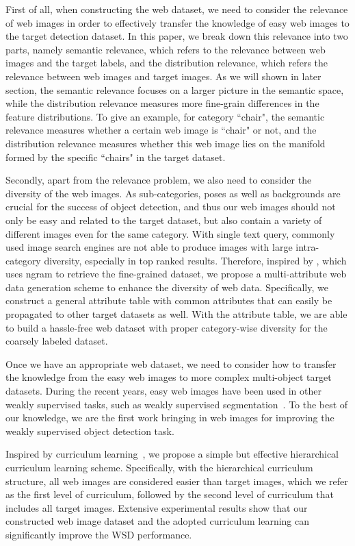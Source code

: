 \documentclass[10pt,twocolumn,letterpaper]{article}
\begin{document}
First of all, when constructing the web dataset, we need to consider the relevance of web images in order to effectively transfer the knowledge of easy web images to the target detection dataset. In this paper, we break down this relevance into two parts, namely semantic relevance, which refers to the relevance between web images and the target labels, and the distribution relevance, which refers the relevance between web images and target images. As we will shown in later section, the semantic relevance focuses on a larger picture in the semantic space, while the distribution relevance measures more fine-grain differences in the feature distributions. To give an example, for category ``chair", the semantic relevance measures whether a certain web image is ``chair" or not, and the distribution relevance measures whether this web image lies on the manifold formed by the specific ``chairs" in the target dataset.  

Secondly, apart from the relevance problem, we also need to consider the diversity of the web images. As sub-categories, poses as well as backgrounds are crucial for the success of object detection, and thus our web images should not only be easy and related to the target dataset, but also contain a variety of different images even for the same category. With single text query, commonly used image search engines are not able to produce images with large intra-category diversity, especially in top ranked results. Therefore, inspired by \cite{divvala2014learning}, which uses ngram to retrieve the fine-grained dataset, we propose a multi-attribute web data generation scheme to enhance the diversity of web data. Specifically, we construct a general attribute table with common attributes that can easily be propagated to other target datasets as well. With the attribute table, we are able to build a hassle-free web dataset with proper category-wise diversity for the coarsely labeled dataset.

Once we have an appropriate web dataset, we need to consider how to transfer the knowledge from the easy web images to more complex multi-object target datasets. During the recent years, easy web images have been used in other weakly supervised tasks, such as weakly supervised segmentation~\cite{wei2016stc}. To the best of our knowledge, we are the first work bringing in web images for improving the weakly supervised object detection task.

Inspired by curriculum learning~\cite{bengio2009curriculum}, we propose a simple but effective hierarchical curriculum learning scheme. Specifically, with the hierarchical curriculum structure, all web images are considered easier than target images, which we refer as the first level of curriculum, followed by the second level of curriculum that includes all target images. 
Extensive experimental results show that our constructed web image dataset and the adopted curriculum learning can significantly improve the WSD performance.
\end{document}

